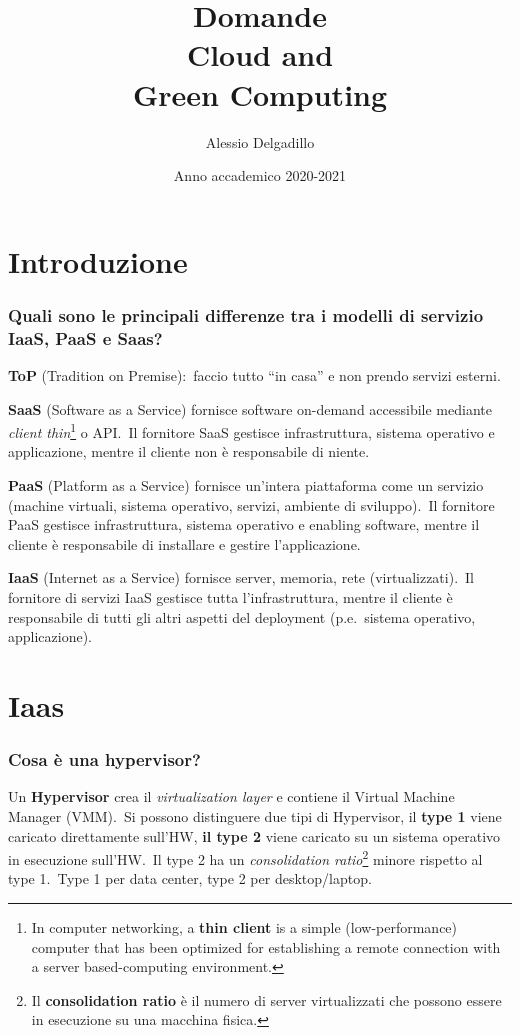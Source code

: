 \documentclass[12pt, a4paper]{article}
\title {Domande\\Cloud and\\Green Computing}
\date{Anno accademico 2020-2021}
\author{Alessio Delgadillo}
\begin{document}
\section{Introduzione}

\subsubsection*{Quali sono le principali differenze tra i modelli di servizio IaaS, PaaS e Saas?}

\textbf{ToP} (Tradition on Premise):\ faccio tutto ``in casa'' e non prendo servizi esterni.\

\noindent\textbf{SaaS} (Software as a Service) fornisce software on-demand accessibile mediante \textit{client thin}\footnote{In computer networking, a \textbf{thin client} is a simple (low-performance) computer that has been
optimized for establishing a remote connection with a server based-computing environment.} o API.\
Il fornitore SaaS gestisce infrastruttura, sistema operativo e applicazione, mentre il cliente non è responsabile di niente.

\noindent\textbf{PaaS} (Platform as a Service) fornisce un'intera piattaforma come un servizio (machine virtuali, sistema operativo, servizi, ambiente di sviluppo).\
Il fornitore PaaS gestisce infrastruttura, sistema operativo e enabling software, mentre il cliente è responsabile di installare e gestire l'applicazione.\

\noindent\textbf{IaaS} (Internet as a Service) fornisce server, memoria, rete (virtualizzati).\
Il fornitore di servizi IaaS gestisce tutta l'infrastruttura, mentre il cliente è responsabile di tutti gli altri aspetti del deployment (p.e.\ sistema operativo, applicazione).

\section{Iaas}

\subsubsection*{Cosa è una hypervisor?}
Un \textbf{Hypervisor} crea il \textit{virtualization layer} e contiene il Virtual Machine Manager (VMM).\
Si possono distinguere due tipi di Hypervisor, il \textbf{type 1} viene caricato direttamente sull'HW, \textbf{il type 2} viene caricato su un sistema operativo in esecuzione sull'HW.\
Il type 2 ha un \textit{consolidation ratio}\footnote{Il \textbf{consolidation ratio} è il numero di server virtualizzati che possono essere in esecuzione su una
macchina fisica.} minore rispetto al type 1.\
Type 1 per data center, type 2 per desktop/laptop.
\end{document}
